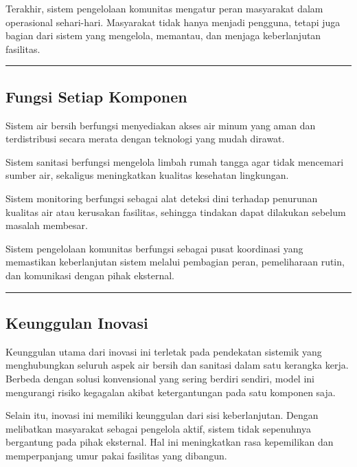 \documentclass[
  letterpaper,
  DIV=11,
  numbers=noendperiod]{scrreprt}
\begin{document}
Terakhir, sistem pengelolaan komunitas mengatur peran masyarakat dalam
operasional sehari-hari. Masyarakat tidak hanya menjadi pengguna, tetapi
juga bagian dari sistem yang mengelola, memantau, dan menjaga
keberlanjutan fasilitas.

\begin{center}\rule{0.5\linewidth}{0.5pt}\end{center}

\subsection{Fungsi Setiap Komponen}\label{fungsi-setiap-komponen}

Sistem air bersih berfungsi menyediakan akses air minum yang aman dan
terdistribusi secara merata dengan teknologi yang mudah dirawat.

Sistem sanitasi berfungsi mengelola limbah rumah tangga agar tidak
mencemari sumber air, sekaligus meningkatkan kualitas kesehatan
lingkungan.

Sistem monitoring berfungsi sebagai alat deteksi dini terhadap penurunan
kualitas air atau kerusakan fasilitas, sehingga tindakan dapat dilakukan
sebelum masalah membesar.

Sistem pengelolaan komunitas berfungsi sebagai pusat koordinasi yang
memastikan keberlanjutan sistem melalui pembagian peran, pemeliharaan
rutin, dan komunikasi dengan pihak eksternal.

\begin{center}\rule{0.5\linewidth}{0.5pt}\end{center}

\subsection{Keunggulan Inovasi}\label{keunggulan-inovasi}

Keunggulan utama dari inovasi ini terletak pada pendekatan sistemik yang
menghubungkan seluruh aspek air bersih dan sanitasi dalam satu kerangka
kerja. Berbeda dengan solusi konvensional yang sering berdiri sendiri,
model ini mengurangi risiko kegagalan akibat ketergantungan pada satu
komponen saja.

Selain itu, inovasi ini memiliki keunggulan dari sisi keberlanjutan.
Dengan melibatkan masyarakat sebagai pengelola aktif, sistem tidak
sepenuhnya bergantung pada pihak eksternal. Hal ini meningkatkan rasa
kepemilikan dan memperpanjang umur pakai fasilitas yang dibangun.
\end{document}
